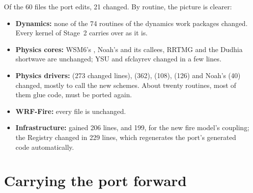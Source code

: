 Of the 60 files the port edits, 21 changed. By routine, the picture is clearer:
\begin{itemize}
  \item \textbf{Dynamics:} none of the 74 routines of the dynamics work packages changed. Every kernel of Stage~2
    carries over as it is.
  \item \textbf{Physics cores:} WSM6's , Noah's  and its callees, RRTMG and the Dudhia
    shortwave are unchanged; YSU and sfclayrev changed in a few lines.
  \item \textbf{Physics drivers:}  (273 changed lines),  (362),
     (108),  (126) and Noah's  (40) changed, mostly to call the
    new schemes. About twenty routines, most of them glue code, must be ported again.
  \item \textbf{WRF-Fire:} every  file is unchanged.
  \item \textbf{Infrastructure:}  gained 206 lines, and  199, for the new fire
    model's coupling; the Registry changed in 229 lines, which regenerates the port's generated code automatically.
\end{itemize}

\section{Carrying the port forward}

